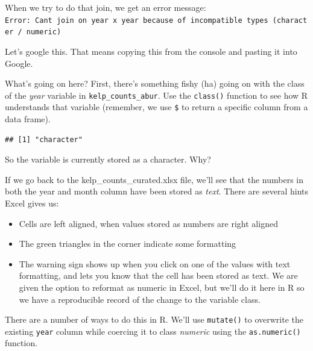 \documentclass[]{book}
\newenvironment{Shaded}{\begin{snugshade}}{\end{snugshade}}
\newcommand{\CommentTok}[1]{\textcolor[rgb]{0.56,0.35,0.01}{\textit{#1}}}
\newcommand{\DataTypeTok}[1]{\textcolor[rgb]{0.13,0.29,0.53}{#1}}
\newcommand{\KeywordTok}[1]{\textcolor[rgb]{0.13,0.29,0.53}{\textbf{#1}}}
\newcommand{\NormalTok}[1]{#1}
\newcommand{\OperatorTok}[1]{\textcolor[rgb]{0.81,0.36,0.00}{\textbf{#1}}}
\newcommand{\StringTok}[1]{\textcolor[rgb]{0.31,0.60,0.02}{#1}}
\providecommand{\tightlist}{%
  \setlength{\itemsep}{0pt}\setlength{\parskip}{0pt}}
\begin{document}
When we try to do that join, we get an error message:
\texttt{Error:\ Can\textquotesingle{}t\ join\ on\ \textquotesingle{}year\textquotesingle{}\ x\ \textquotesingle{}year\textquotesingle{}\ because\ of\ incompatible\ types\ (character\ /\ numeric)}

Let's google this. That means copying this from the console and pasting it into Google.

What's going on here? First, there's something fishy (ha) going on with the class of the \emph{year} variable in \texttt{kelp\_counts\_abur}. Use the \texttt{class()} function to see how R understands that variable (remember, we use \texttt{\$} to return a specific column from a data frame).

\begin{Shaded}
\end{Shaded}

\begin{verbatim}
## [1] "character"
\end{verbatim}

So the variable is currently stored as a character. Why?

If we go back to the kelp\_counts\_curated.xlsx file, we'll see that the numbers in both the year and month column have been stored as \emph{text}. There are several hints Excel gives us:

\begin{itemize}
\tightlist
\item
  Cells are left aligned, when values stored as numbers are right aligned
\item
  The green triangles in the corner indicate some formatting
\item
  The warning sign shows up when you click on one of the values with text formatting, and lets you know that the cell has been stored as text. We are given the option to reformat as numeric in Excel, but we'll do it here in R so we have a reproducible record of the change to the variable class.
\end{itemize}

There are a number of ways to do this in R. We'll use \texttt{mutate()} to overwrite the existing \texttt{year} column while coercing it to class \emph{numeric} using the \texttt{as.numeric()} function.

\begin{Shaded}
\end{Shaded}
\end{document}
